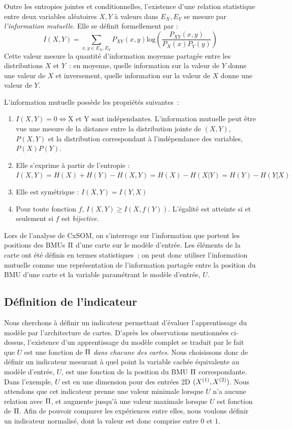 \documentclass[../main]{subfiles}
\begin{document}
Outre les entropies jointes et conditionnelles, l'existence d'une relation statistique entre deux variables aléatoires $X,Y$ à valeurs dans $E_X,E_Y$ se mesure par \emph{l'information mutuelle}. Elle se définit formellement par : 
\begin{equation}
 I(X,Y) = \sum_{x,y \in E_X,E_Y}{P_{XY}(x,y)\textrm{log}(\frac{P_{XY}(x,y)}{P_X(x)P_Y(y)})}
\end{equation}
Cette valeur mesure la quantité d'information moyenne partagée entre les distributions $X$ et $Y$~: en moyenne, quelle information sur la valeur de $Y$ donne une valeur de $X$ et inversement, quelle information sur la valeur de $X$ donne une valeur de $Y$.

L'information mutuelle possède les propriétés suivantes~:
\begin{enumerate}
\item $I(X,Y) = 0 \Leftrightarrow \textrm{X et Y sont indépendantes}$. L'information mutuelle peut être vue une mesure de la distance entre la distribution jointe de $(X,Y)$, $P(X,Y)$ et la distribution correspondant à l'indépendance des variables, $P(X)P(Y)$.
\item Elle s'exprime à partir de l'entropie : $I(X,Y) = H(X) + H(Y) - H(X,Y) = H(X) - H(X|Y) = H(Y) - H(Y|X)$
\item Elle est symétrique : $I(X,Y) = I(Y,X)$
\item Pour toute fonction $f$, $I(X,Y) \geq I(X,f(Y))$. L'égalité est atteinte si et seulement si $f$ est \emph{bijective}.
\end{enumerate}

Lors de l'analyse de CxSOM, on s'interroge sur l'information que portent les positions des BMUs $\Pi$ d'une carte sur le modèle d'entrée.
Les éléments de la carte ont été définis en termes statistiques~; on peut donc utiliser l'information mutuelle comme une représentation de l'information partagée entre la position du BMU d'une carte et la variable paramétrant le modèle d'entrée, $U$.

\subsection{Définition de l'indicateur}

Nous cherchons à définir un indicateur permettant d'évaluer l'apprentissage du modèle par l'architecture de cartes. D'après les observations mentionnées ci-dessus, l'existence d'un apprentissage du modèle complet se traduit par le fait que $U$ est une fonction de $\Pi$ \emph{dans chacune des cartes}.
Nous choisissons donc de définir un indicateur mesurant à quel point la variable cachée équivalente au modèle d'entrée, $U$, est une fonction de la position du BMU $\Pi$ correspondante.
Dans l'exemple, $U$ est en une dimension pour des entrées 2D $(X^{({1})},X^{({2})})$.
Nous attendons que cet indicateur prenne une valeur minimale lorsque $U$ n'a aucune relation avec $\Pi$, et augmente jusqu'à une valeur maximale lorsque $U$ est fonction de $\Pi$. Afin de pouvoir comparer les expériences entre elles, nous voulons définir un indicateur normalisé, dont la valeur est donc comprise entre $0$ et $1$.
\end{document}
